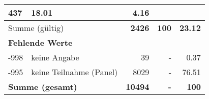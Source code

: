 \begin{longtable}{lXrrr}
       \num{437} &
       \num[round-mode=places,round-precision=2]{18.01} &
         \num[round-mode=places,round-precision=2]{4.16} \\
     \midrule
     \multicolumn{2}{l}{Summe (gültig)} &
       \textbf{\num{2426}} &
     \textbf{\num{100}} &
       \textbf{\num[round-mode=places,round-precision=2]{23.12}} \\
     \multicolumn{5}{l}{\textbf{Fehlende Werte}}\\
       -998 &
       keine Angabe &
         \num{39} &
        - &
         \num[round-mode=places,round-precision=2]{0.37} \\
       -995 &
       keine Teilnahme (Panel) &
         \num{8029} &
        - &
         \num[round-mode=places,round-precision=2]{76.51} \\
     \midrule
     \multicolumn{2}{l}{\textbf{Summe (gesamt)}} &
          \textbf{\num{10494}} &
        \textbf{-} &
        \textbf{\num{100}} \\
     \bottomrule
     \end{longtable}
     
